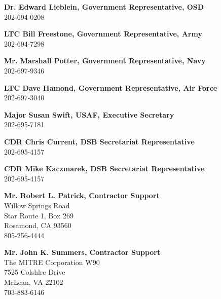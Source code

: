 \documentclass[12pt,final]{article}
\begin{document}
\medskip

\textbf{Dr. Edward Lieblein, Government Representative, OSD}\\
\hspace*{2cm}202-694-0208

\textbf{LTC Bill Freestone, Government Representative, Army}\\
\hspace*{2cm}202-694-7298

\textbf{Mr. Marshall Potter, Government Representative, Navy}\\
\hspace*{2cm}202-697-9346

\textbf{LTC Dave Hamond, Government Representative, Air Force}\\
\hspace*{2cm}202-697-3040

\textbf{Major Susan Swift, USAF, Executive Secretary}\\
\hspace*{2cm}202-695-7181

\textbf{CDR Chris Current, DSB Secretariat Representative}\\
\hspace*{2cm}202-695-4157

\textbf{CDR Mike Kaczmarek, DSB Secretariat Representative}\\
\hspace*{2cm}202-695-4157

\textbf{Mr. Robert L. Patrick, Contractor Support}\\
\hspace*{2cm}Willow Springs Road\\
\hspace*{2cm}Star Route 1, Box 269\\
\hspace*{2cm}Rosamond, CA 93560\\
\hspace*{2cm}805-256-4444

\medskip

\textbf{Mr. John K. Summers, Contractor Support}\\
\hspace*{2cm}The MITRE Corporation W90\\
\hspace*{2cm}7525 Colshlre Drive\\
\hspace*{2cm}McLean, VA 22102\\
\hspace*{2cm}703-883-6146
\end{document}
